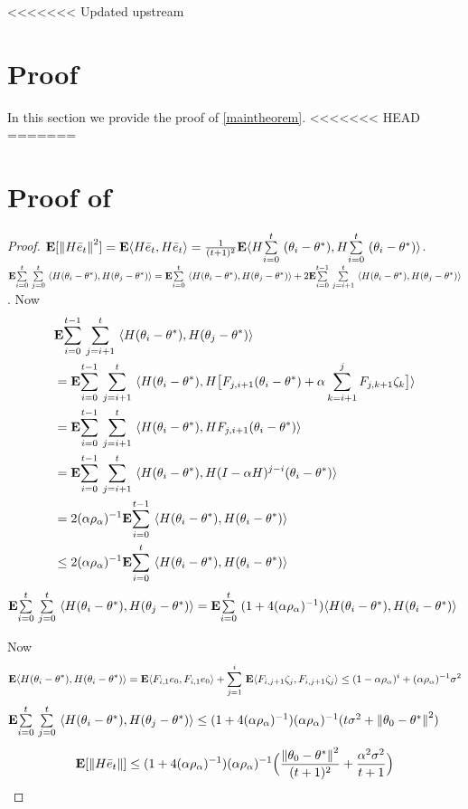 <<<<<<< Updated upstream
\section{Proof}
\label{sec:proof}
In this section we provide the proof of \cref{maintheorem}.
<<<<<<< HEAD
=======
\section{Proof of }
\begin{proof}
$\E[\norm{H\eb_t}^2]=\E\ip{H\eb_t,H\eb_t}=\frac{1}{(t+1)^2}\E\ip{H\ous{\sum}{i=0}{t}(\theta_i-\ts),H\ous{\sum}{i=0}{t}(\theta_i-\ts)}$.
$\E\ous{\sum}{i=0}{t}\ous{\sum}{j=0}{t}\ip{H(\theta_i-\theta^*),H(\theta_j-\theta^*)}=\E\ous{\sum}{i=0}{t}\ip{H(\theta_i-\theta^*),H(\theta_j-\theta^*)}+ 2\E\ous{\sum}{i=0}{t-1}\ous{\sum}{j=i+1}{t}\ip{H(\theta_i-\theta^*),H(\theta_j-\theta^*)}$. Now
\begin{align}\label{inter}
&\E\ous{\sum}{i=0}{t-1}\ous{\sum}{j=i+1}{t}\ip{H(\theta_i-\theta^*),H(\theta_j-\theta^*)}\nn\\
&=\E\ous{\sum}{i=0}{t-1}\ous{\sum}{j=i+1}{t}\ip{H(\theta_i-\theta^*),H\big[F_{j,i+1} (\theta_i-\theta^*)+\alpha\sum_{k=i+1}^j F_{j,k+1}\zeta_{k}\big]}\nn\\
&=\E\ous{\sum}{i=0}{t-1}\ous{\sum}{j=i+1}{t}\ip{H(\theta_i-\theta^*),H F_{j,i+1} (\theta_i-\theta^*)}\nn\\
&=\E\ous{\sum}{i=0}{t-1}\ous{\sum}{j=i+1}{t}\ip{H(\theta_i-\theta^*),H(I-\alpha H)^{j-i} (\theta_i-\theta^*)}\nn\\
&=2(\alpha\rho_{\alpha})^{-1}\E\ous{\sum}{i=0}{t-1}\ip{H(\theta_i-\theta^*),H (\theta_i-\theta^*)}\nn\\
&\leq2(\alpha\rho_{\alpha})^{-1}\E\ous{\sum}{i=0}{t}\ip{H(\theta_i-\theta^*),H (\theta_i-\theta^*)}\nn\\
\end{align}
$\E\ous{\sum}{i=0}{t}\ous{\sum}{j=0}{t}\ip{H(\theta_i-\theta^*),H(\theta_j-\theta^*)}=\E\ous{\sum}{i=0}{t}(1+4(\alpha\rho_{\alpha})^{-1})\ip{H(\theta_i-\theta^*),H(\theta_i-\theta^*)}$

Now
\begin{align*}
\E\ip{H(\theta_i-\theta^*),H(\theta_i-\theta^*)}=\E\ip{F_{i,1}e_0,F_{i,1}e_0}+\ous{\sum}{j=1}{i}\E\ip{F_{i,j+1}\zeta_j,F_{i,j+1}\zeta_j}
\leq (1-\alpha\rho_{\alpha})^i+ (\alpha\rho_{\alpha})^{-1}\sigma^2
\end{align*}
$\E\ous{\sum}{i=0}{t}\ous{\sum}{j=0}{t}\ip{H(\theta_i-\theta^*),H(\theta_j-\theta^*)}\leq (1+4(\alpha\rho_{\alpha})^{-1}) (\alpha\rho_{\alpha})^{-1}(t\sigma^2+\norm{\theta_0-\ts}^2)$
\begin{align}
\E[\norm{H\eb_t}]\leq (1+4(\alpha\rho_{\alpha})^{-1}) (\alpha\rho_{\alpha})^{-1} \Big(\frac{\norm{\theta_0-\ts}^2}{(t+1)^2}+ \frac{\alpha^2\sigma^2}{t+1} \Big)
\end{align}
\end{proof}

